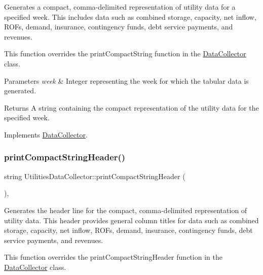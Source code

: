 Generates a compact, comma-\/delimited representation of utility data for a specified week. This includes data such as combined storage, capacity, net inflow, R\+O\+Fs, demand, insurance, contingency funds, debt service payments, and revenues. 

This function overrides the {\ttfamily print\+Compact\+String} function in the {\ttfamily \mbox{\hyperlink{classDataCollector}{Data\+Collector}}} class.


\begin{DoxyParams}{Parameters}
{\em week} & Integer representing the week for which the tabular data is generated.\\
\hline
\end{DoxyParams}
\begin{DoxyReturn}{Returns}
A string containing the compact representation of the utility data for the specified week. 
\end{DoxyReturn}


Implements \mbox{\hyperlink{classDataCollector_a2eac264fa5612aed5a830b12de4f4ae3}{Data\+Collector}}.

\mbox{\label{classUtilitiesDataCollector_ab3409c407783fd4451f310d2fc177b22}} 
\subsubsection{\texorpdfstring{print\+Compact\+String\+Header()}{printCompactStringHeader()}}
{\footnotesize\ttfamily string Utilities\+Data\+Collector\+::print\+Compact\+String\+Header (\begin{DoxyParamCaption}{ }\end{DoxyParamCaption})\hspace{0.3cm}{\ttfamily [override]}, {\ttfamily [virtual]}}



Generates the header line for the compact, comma-\/delimited representation of utility data. This header provides general column titles for data such as combined storage, capacity, net inflow, R\+O\+Fs, demand, insurance, contingency funds, debt service payments, and revenues. 

This function overrides the {\ttfamily print\+Compact\+String\+Header} function in the {\ttfamily \mbox{\hyperlink{classDataCollector}{Data\+Collector}}} class.

